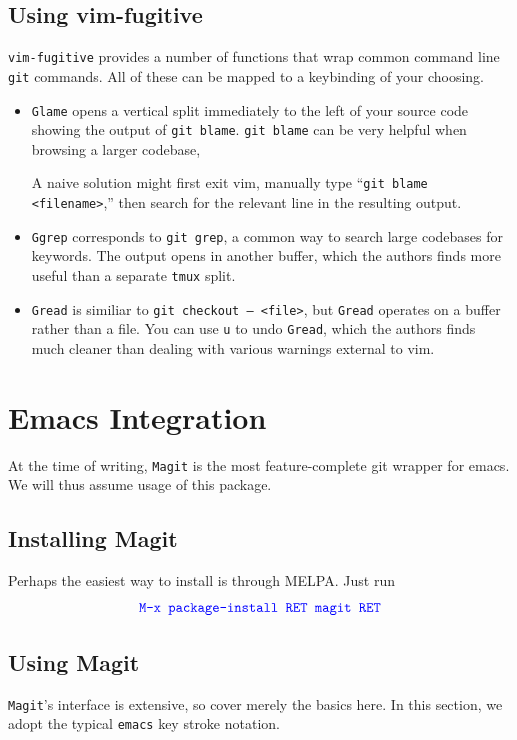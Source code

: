 \documentclass[12pt]{report}
\newcommand\code[1]{{\color{blue}\texttt{#1}}}
\begin{document}
\section{Using vim-fugitive}

\texttt{vim-fugitive} provides a number of functions that wrap common
command line \texttt{git} commands. All of these can be mapped to a
keybinding of your choosing.

\begin{itemize}
\item \code{Glame} opens a vertical split immediately to the left of
  your source code showing the output of \code{git blame}. \code{git
    blame} can be very helpful when browsing a larger codebase,

  A naive solution might first exit vim, manually type “\code{git
    blame <filename>},” then search for the relevant line in the
  resulting output.

\item \code{Ggrep} corresponds to \code{git grep}, a common way to
  search large codebases for keywords. The output opens in another
  buffer, which the authors finds more useful than a separate
  \texttt{tmux} split.

\item \code{Gread} is similiar to \code{git checkout -- <file>}, but
  \code{Gread} operates on a buffer rather than a file. You can use
  \code{u} to undo \code{Gread}, which the authors finds much cleaner
  than dealing with various warnings external to vim.
\end{itemize}

\chapter{Emacs Integration}

At the time of writing, \code{Magit} is the most feature-complete git
wrapper for emacs. We will thus assume usage of this package.

\section{Installing Magit}
Perhaps the easiest way to install is through MELPA. Just run
\[
  \code{M-x package-install RET magit RET}
\]

\section{Using Magit}
\code{Magit}'s interface is extensive, so cover merely the basics
here. In this section, we adopt the typical \texttt{emacs} key stroke
notation.
\end{document}

